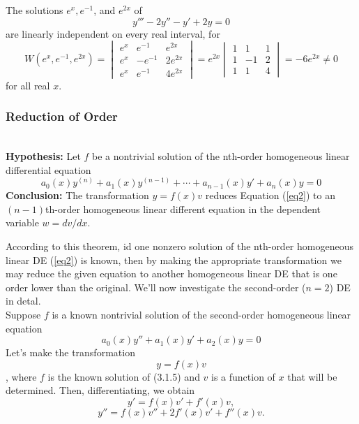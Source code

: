 \begin{example}{}{}
    The solutions $e^{x}, e^{-1}$, and $e^{2x}$ of \[
        y''' - 2y'' - y' + 2y = 0
    \] are linearly independent on every real interval, for \[
        W(e^x, e^{-1}, e^{2x}) =
        \begin{vmatrix}
            e^{x} & e^{-1} & e^{2x} \\
            e^{x} & -e^{-1} & 2e^{2x} \\
            e^{x} & e^{-1} & 4e^{2x}
        \end{vmatrix}
        = e^{2x}
        \begin{vmatrix}
            1 & 1 & 1 \\
            1 & -1 & 2 \\
            1 & 1 & 4
        \end{vmatrix} 
        = -6e^{2x} \neq 0
    \] for all real $x$.
\end{example}


\vspace{20pt}
\subsubsection{Reduction of Order}

\begin{theorem}{}{}
    \\\textbf{Hypothesis:} Let $f$ be a nontrivial solution of the nth-order homogeneous linear differential equation
    \begin{equation}\tag{3.1.2}
        a_0(x)y^{(n)} + a_1(x)y^{(n-1)} + \cdots + a_{n-1}(x)y' + a_n(x)y = 0
    \end{equation}
    \textbf{Conclusion:} The transformation $y = f(x)v$ reduces Equation (\ref{eq2}) to an $(n-1)$th-order homogeneous linear different equation in the dependent variable $w = dv/dx$.
\end{theorem}

According to this theorem, id one nonzero solution of the nth-order homogeneous linear DE (\ref{eq2}) is known, then by making the appropriate transformation we may reduce the given equation to another homogeneous linear DE that is one order lower than the original. We'll now investigate the second-order ($n=2$) DE in detal.\\

Suppose $f$ is a known nontrivial solution of the second-order homogeneous linear equation
\begin{equation}
    a_0(x)y'' + a_1(x)y' + a_2(x)y = 0
\end{equation}
Let's make the transformation
\begin{equation}
    y = f(x)v
\end{equation}
, where $f$ is the known solution of (3.1.5) and $v$ is a function of $x$ that will be determined. Then, differentiating, we obtain
\begin{equation}
    y' = f(x)v' + f'(x)v,
\end{equation}
\begin{equation}
    y'' = f(x)v'' + 2f'(x)v' + f''(x)v.
\end{equation}

